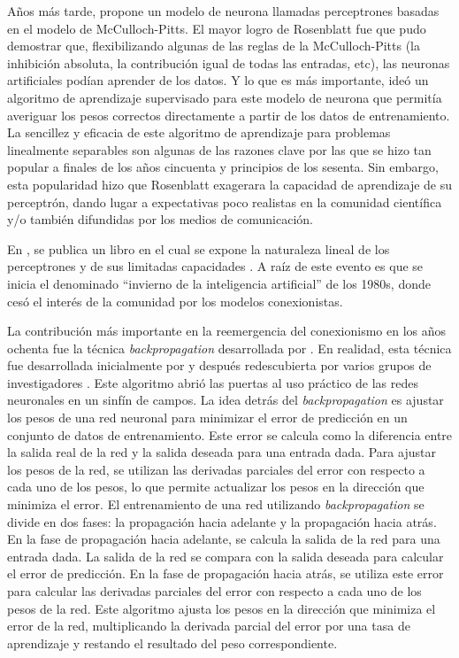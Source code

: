 Años más tarde, \cite{rosenblatt1958perceptron} propone un modelo de neurona llamadas perceptrones basadas en el modelo
de McCulloch-Pitts. El mayor logro de Rosenblatt fue que pudo demostrar que, flexibilizando algunas de las reglas de la
McCulloch-Pitts (la inhibición absoluta, la contribución igual de todas las entradas, etc), las neuronas artificiales
podían aprender de los datos. Y lo que es más importante, ideó un algoritmo de aprendizaje supervisado para este modelo
de neurona que permitía averiguar los pesos correctos directamente a partir de los datos de entrenamiento. La sencillez
y eficacia de este algoritmo de aprendizaje para problemas linealmente separables son algunas de las razones clave por
las que se hizo tan popular a finales de los años cincuenta y principios de los sesenta. Sin embargo, esta popularidad
hizo que Rosenblatt exagerara la capacidad de aprendizaje de su perceptrón, dando lugar a expectativas poco realistas
en la comunidad científica y/o también difundidas por los medios de comunicación.

En \citeyear{minsky1969perceptrons}, se publica un libro en el cual se expone la naturaleza lineal de los perceptrones
y de sus limitadas capacidades \parencite{minsky1969perceptrons}. A raíz de este evento es que se inicia el denominado ``invierno de la inteligencia
artificial'' de los 1980s, donde cesó el interés de la comunidad por los modelos conexionistas.

La contribución más importante en la reemergencia del conexionismo en los años ochenta fue la técnica {\it
backpropagation} desarrollada por \cite{rumelhart1986learning}. En realidad, esta técnica fue desarrollada inicialmente
por \cite{werbos1974beyond} y después redescubierta por varios grupos de investigadores \parencite{lecun1985learning, rumelhart1986learning}. Este algoritmo abrió las puertas al uso práctico de las redes
neuronales en un sinfín de campos. La idea detrás del {\it backpropagation} es ajustar los pesos de una red neuronal
para minimizar el error de predicción en un conjunto de datos de entrenamiento. Este error se calcula como la
diferencia entre la salida real de la red y la salida deseada para una entrada dada. Para ajustar los pesos de la red,
se utilizan las derivadas parciales del error con respecto a cada uno de los pesos, lo que permite actualizar los pesos
en la dirección que minimiza el error. El entrenamiento de una red utilizando {\it backpropagation} se divide en dos
fases: la propagación hacia adelante y la propagación hacia atrás. En la fase de propagación hacia adelante, se calcula
la salida de la red para una entrada dada. La salida de la red se compara con la salida deseada para calcular el error
de predicción. En la fase de propagación hacia atrás, se utiliza este error para calcular las derivadas parciales del
error con respecto a cada uno de los pesos de la red. Este algoritmo ajusta los pesos en la dirección que minimiza el
error de la red, multiplicando la derivada parcial del error por una tasa de aprendizaje y restando el resultado del
peso correspondiente.

